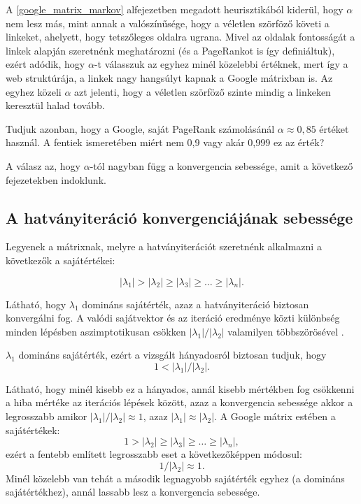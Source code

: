 \documentclass[12pt,a4paper]{article}
\begin{document}
A \ref{google_matrix_markov} alfejezetben megadott heurisztikából kiderül, hogy $\alpha$ nem lesz más, mint annak a valószínűsége, hogy a véletlen szörföző követi a linkeket, ahelyett, hogy tetszőleges oldalra ugrana. Mivel az oldalak fontosságát a linkek alapján szeretnénk meghatározni (és a PageRankot is így definiáltuk), ezért adódik, hogy $\alpha$-t válasszuk az egyhez minél közelebbi értéknek, mert így a web struktúrája, a linkek nagy hangsúlyt kapnak a Google mátrixban is. Az egyhez közeli $\alpha$ azt jelenti, hogy a véletlen szörföző szinte mindig a linkeken keresztül halad tovább.

Tudjuk azonban, hogy a Google, saját PageRank számolásánál $\alpha \approx 0,85$ \cite{lang2} értéket használ. A fentiek ismeretében miért nem 0,9 vagy akár 0,999 ez az érték? 

A válasz az, hogy $\alpha$-tól nagyban függ a konvergencia sebessége, amit a következő fejezetekben indoklunk.

\subsection{A hatványiteráció konvergenciájának sebessége}\label{konvergencia_sebesseg}

Legyenek a mátrixnak, melyre a hatványiterációt szeretnénk alkalmazni a következők a sajátértékei:

\[ |\lambda_1| > |\lambda_2| \geq |\lambda_3| \geq \ldots \geq |\lambda_n|. \] 

Látható, hogy $\lambda_1$ domináns sajátérték, azaz a hatványiteráció biztosan konvergálni fog. A valódi sajátvektor és az iteráció eredménye közti különbség minden lépésben aszimptotikusan csökken $ |\lambda_1| / |\lambda_2|$ valamilyen többszörösével \cite{poweriteration}.

$\lambda_1$ domináns sajátérték, ezért a vizsgált hányadosról biztosan tudjuk, hogy
\[ 1 < |\lambda_1| / |\lambda_2|. \]

Látható, hogy minél kisebb ez a hányados, annál kisebb mértékben fog csökkenni a hiba mértéke az iterációs lépések között, azaz a konvergencia sebessége akkor a legrosszabb amikor $|\lambda_1| / |\lambda_2| \approx 1$, azaz $|\lambda_1| \approx |\lambda_2|$. A Google mátrix estében a sajátértékek:
\[ 1 > |\lambda_2| \geq |\lambda_3| \geq \ldots \geq |\lambda_n|, \]
ezért a fentebb említett legrosszabb eset a következőképpen módosul:
\[ 1 / |\lambda_2| \approx 1. \]
\noindent
Minél közelebb van tehát a második legnagyobb sajátérték egyhez (a domináns sajátértékhez), annál lassabb lesz a konvergencia sebessége.
\end{document}
